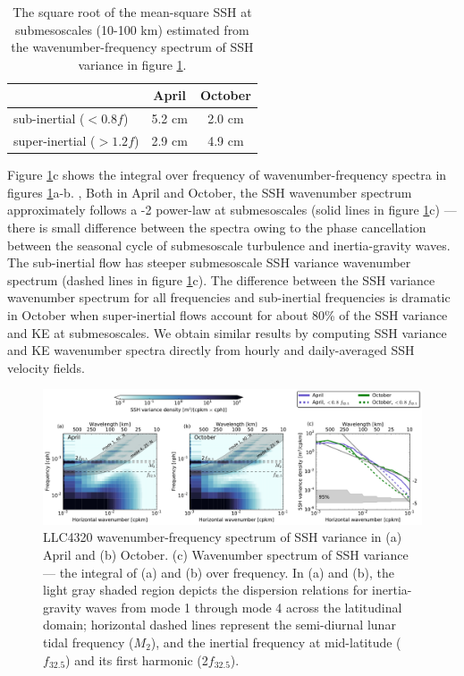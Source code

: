 \documentclass[grl]{agutex2015}
\begin{document}
\begin{article}
\begin{table}
\label{tab1}
\caption{The square root of the mean-square SSH at submesoscales (10-100 km)
        estimated from the wavenumber-frequency spectrum of SSH variance in figure \ref{fig4}.
        }
  \begin{center}
    \begin{tabular}{  l | c | c }
    \hline
    & April & October\\
    \hline
  sub-inertial ($<0.8f$)   & 5.2 cm & 2.0 cm  \\
  super-inertial ($>1.2f$) & 2.9 cm  & 4.9 cm\\
  \hline
    \end{tabular}
  \end{center}
\end{table}

Figure \ref{fig4}c shows the integral over frequency
of wavenumber-frequency spectra in figures \ref{fig4}a-b. ,
Both in April and October, the
SSH wavenumber spectrum approximately follows a -2 power-law at submesoscales
(solid lines in figure \ref{fig4}c)  --- there is
small difference between the spectra owing to the phase cancellation between the
seasonal cycle of submesoscale turbulence and inertia-gravity waves. The sub-inertial flow
has steeper submesoscale SSH variance wavenumber spectrum (dashed lines in figure \ref{fig4}c).
 The difference between the SSH variance wavenumber spectrum for all frequencies and
 sub-inertial frequencies is dramatic in October when super-inertial flows account for
 about 80\% of the SSH variance and KE at submesoscales. We obtain similar results by computing
SSH variance and KE wavenumber spectra directly from hourly and daily-averaged
SSH velocity fields.

\begin{figure}[ht]
  \begin{center}
    \includegraphics[width=.8\textwidth]{figs/fig4.pdf}
 \caption{\small LLC4320 wavenumber-frequency spectrum of SSH variance in (a) April and (b) October.
          (c) Wavenumber spectrum of SSH variance --- the integral of (a) and (b) over frequency.
          In (a) and (b), the light gray shaded region depicts the dispersion relations for inertia-gravity
          waves from mode 1 through mode 4 across the latitudinal domain; horizontal dashed lines represent the semi-diurnal
          lunar tidal frequency ($M_2$), and the inertial frequency at mid-latitude
          ($f_{32.5}$) and its first harmonic (2$f_{32.5}$). }
  \label{fig4}
 \end{center}
\end{figure}



\end{article}
\end{document}
